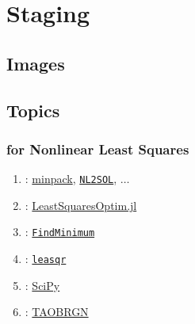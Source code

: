 % 

\section{Staging}

\subsection{Images}

\subsection{Topics}
%
\begin{frame}\frametitle{ for Nonlinear Least Squares}
\begin{enumerate}
	\item \mfortran: \href{\urlMinpack}{minpack}, \href{https://people.math.sc.edu/Burkardt/f_src/nl2sol/nl2sol.html}{\texttt{NL2SOL}}, $\dots$
	\item \julia: \href{https://juliapackages.com/p/leastsquaresoptim}{LeastSquaresOptim.jl}
	\item \mathematica: \href{https://reference.wolfram.com/language/ref/FindMinimum.html}{\texttt{FindMinimum}}
	\item \octave: \href{https://octave.sourceforge.io/optim/function/leasqr.html}{\texttt{leasqr}}
	\item \python: \href{https://docs.scipy.org/doc/scipy/reference/generated/scipy.optimize.curve_fit.html}{SciPy}
	\item \href{https://petsc.org/release/}{}: \href{https://petsc.org/release/manualpages/Tao/TAOBRGN/}{TAOBRGN}
\end{enumerate}
\end{frame}
%
